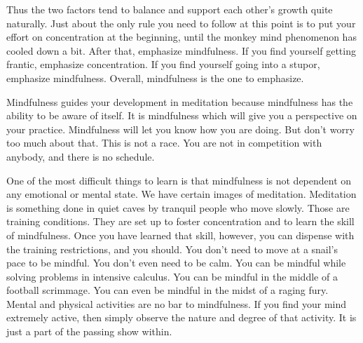Thus the two factors tend to balance and support each other's growth quite
naturally. Just about the only rule you need to follow at this point is to put
your effort on concentration at the beginning, until the monkey mind phenomenon
has cooled down a bit. After that, emphasize mindfulness. If you find yourself
getting frantic, emphasize concentration. If you find yourself going into a
stupor, emphasize mindfulness. Overall, mindfulness is the one to emphasize.

Mindfulness guides your development in meditation because mindfulness has the
ability to be aware of itself. It is mindfulness which will give you a
perspective on your practice. Mindfulness will let you know how you are doing.
But don't worry too much about that. This is not a race. You are not in
competition with anybody, and there is no schedule.

One of the most difficult things to learn is that mindfulness is not dependent
on any emotional or mental state. We have certain images of meditation.
Meditation is something done in quiet caves by tranquil people who move slowly.
Those are training conditions. They are set up to foster concentration and to
learn the skill of mindfulness. Once you have learned that skill, however, you
can dispense with the training restrictions, and you should. You don't need to
move at a snail's pace to be mindful. You don't even need to be calm. You can be
mindful while solving problems in intensive calculus. You can be mindful in the
middle of a football scrimmage. You can even be mindful in the midst of a raging
fury. Mental and physical activities are no bar to mindfulness. If you find your
mind extremely active, then simply observe the nature and degree of that
activity. It is just a part of the passing show within.
